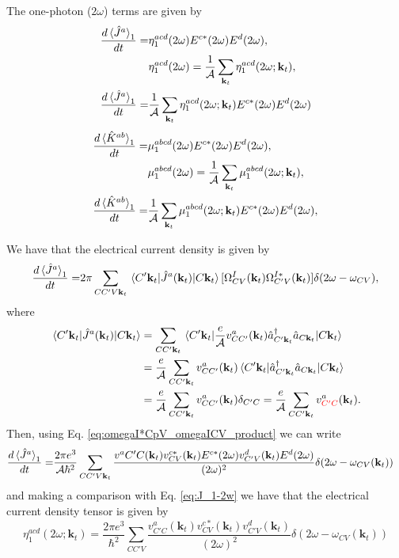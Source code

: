 \documentclass{article}
\newcommand{\kt}{\mathbf{k}_{t}}
\begin{document}
The one-photon ($2\omega$) terms are given by
\begin{align}
\frac{d\ev*{\hat{J}^{a}}_{1}}{dt} =& \eta^{acd}_{1}(2\omega) E^{c*}(2\omega)
E^{d}(2\omega), \nonumber \\ 
& \eta^{acd}_{1}(2\omega) = \frac{1}{\mathcal{A}} \sum_{\kt} \eta^{acd}_{1}
(2\omega;\kt), \nonumber \\
\frac{d\ev*{\hat{J}^{a}}_{1}}{dt} =& \frac{1}{\mathcal{A}} \sum_{\kt} 
\eta^{acd}_{1} (2\omega;\kt) E^{c*}(2\omega) E^{d}(2\omega) \label{eq:J_1-2w}
\end{align}
\begin{align}
\frac{d\ev*{\hat{K}^{ab}}_{1}}{dt} =& \mu^{abcd}_{1}(2\omega)
E^{c*}(2\omega) E^{d}(2\omega), \nonumber \\ 
& \mu^{abcd}_{1}(2\omega) = \frac{1}{\mathcal{A}} \sum_{\kt} \mu^{abcd}_{1}
(2\omega;\kt) , \nonumber \\
\frac{d\ev*{\hat{K}^{ab}}_{1}}{dt} =& \frac{1}{\mathcal{A}} \sum_{\kt} 
\mu^{abcd}_{1}(2\omega;\kt) E^{c*}(2\omega) E^{d}(2\omega), \label{eq:mu_1-2w}
\end{align}

We have that the electrical current density is given by
\begin{equation*}
\begin{split}
\frac{d \ev*{\hat{J}^{a}}_1}{dt} =& 2\pi \sum_{CC'V\kt} \mel*{C'\kt}
{\hat{J}^{a}(\kt)}{C\kt} [\Omega^{I}_{CV}(\kt) \Omega^{I*}_{C'V}(\kt)] 
\delta({2\omega - \omega_{CV}}) , \\
\end{split}
\end{equation*}
where
\begin{equation*}
\begin{split}
\mel*{C'\kt}{\hat{J}^{a}(\kt)}{C\kt} &= 
\sum_{CC'\kt} \mel*{C'\kt}
{\frac{e}{\mathcal{A}} v^{a}_{CC'}(\kt) \hat{a}^{\dag}_{C'\kt} \hat{a}_{C\kt}}
{C\kt} \\
&= \frac{e}{\mathcal{A}} \sum_{CC'\kt} v^{a}_{CC'}(\kt) \mel*{C'\kt} 
{\hat{a}^{\dag}_{C'\kt} \hat{a}_{C\kt}}
{C\kt} \\
&= \frac{e}{\mathcal{A}} \sum_{CC'\kt}
v^{a}_{CC'}(\kt) \delta_{C'C} = \frac{e}{\mathcal{A}} \sum_{CC'\kt}
v^{a}_{{\color{red}{C'C}}}(\kt) .
\end{split}
\end{equation*}
Then, using Eq. \eqref{eq:omegaI*CpV_omegaICV_product} we can write
\begin{equation}
\begin{split}
\frac{d\ev*{\hat{J}^{a}}_{1}}{dt} =& \frac{2 \pi e^{3}}{\mathcal{A} \hbar^{2}}
\sum_{CC'V\kt} \frac{v^{a}{C'C}(\kt) v^{c*}_{CV}(\kt) E^{c*}(2\omega) 
v^{d}_{C'V}(\kt) E^{d}(2\omega)}{(2\omega)^{2}} \delta(2\omega - 
\omega_{CV}(\kt))
\end{split}
\end{equation}
and making a comparison with Eq. \eqref{eq:J_1-2w} we have that the electrical 
current density tensor is given by
\begin{equation}
\eta^{acd}_1(2\omega;\kt) = \frac{2 \pi e^{3}}{\hbar^{2}} \sum_{CC'V}
\frac{v^{a}_{C'C}(\kt) v^{c*}_{CV}(\kt) v^{d}_{C'V}(\kt) }{(2\omega)^{2}}
\delta(2\omega - \omega_{CV}(\kt))
\end{equation}
\end{document}
